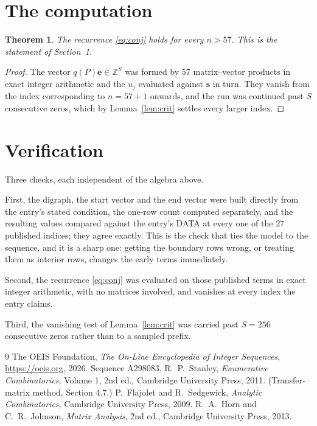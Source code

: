 \documentclass[11pt,a4paper]{article}
\theoremstyle{plain}
\newtheorem{theorem}{Theorem}
\theoremstyle{definition}
\begin{document}
\section{The computation}

\begin{theorem}
The recurrence \eqref{eq:conj} holds for every $n>57$. This is the statement of
Section~1.
\end{theorem}

\begin{proof}
The vector $q(P)\mathbf{e}\in\mathbb{Z}^{S}$ was formed by $57$ matrix--vector
products in exact integer arithmetic and the $u_j$ evaluated against $\mathbf{s}$ in turn.
They vanish from the index corresponding to $n=57+1$ onwards, and the run was continued
past $S$ consecutive zeros, which by Lemma~\ref{lem:crit} settles every larger index.
\end{proof}

\section{Verification}

Three checks, each independent of the algebra above.

First, the digraph, the start vector and the end vector were built directly from the
entry's stated condition, the one-row count computed separately, and the resulting values
compared against the entry's DATA at every one of the $27$ published indices; they
agree exactly. This is the check that ties the model to the sequence, and it is a sharp one:
getting the boundary rows wrong, or treating them as interior rows, changes the early terms
immediately.

Second, the recurrence \eqref{eq:conj} was evaluated on those published terms in exact
integer arithmetic, with no matrices involved, and vanishes at every index the entry claims.

Third, the vanishing test of Lemma~\ref{lem:crit} was carried past $S=256$ consecutive
zeros rather than to a sampled prefix.

\begin{thebibliography}{9}
 The OEIS Foundation, \emph{The On-Line Encyclopedia of Integer
Sequences}, \url{https://oeis.org}, 2026. Sequence A298083.
 R.~P.~Stanley, \emph{Enumerative Combinatorics}, Volume 1, 2nd ed.,
Cambridge University Press, 2011. (Transfer-matrix method, Section 4.7.)
 P.~Flajolet and R.~Sedgewick, \emph{Analytic Combinatorics}, Cambridge
University Press, 2009.
 R.~A.~Horn and C.~R.~Johnson, \emph{Matrix Analysis}, 2nd ed., Cambridge
University Press, 2013.
\end{thebibliography}
\end{document}
